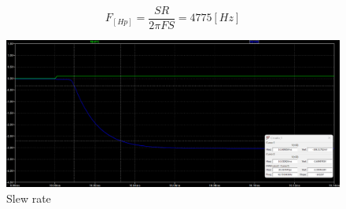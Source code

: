 \documentclass[12pt]{article}
\begin{document}
	\begin{equation}
		F_[Hp]=\frac{SR}{2\pi FS} = 4775[Hz]
	\end{equation} 
	
	\begin{figure}[h!]
		\includegraphics[width=\linewidth]{Imagenes_simulaciones/Sim_slow_rate}
		\caption[Slew rate]{Slew rate}
		\label{fig:simslowrate}
	\end{figure}

	
	
\end{document}
